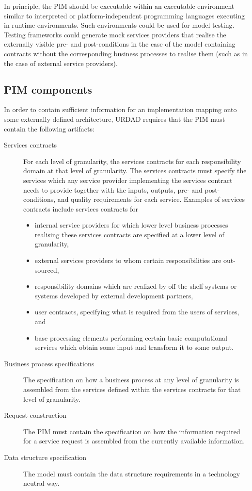 \documentclass{IOS-Book-Article}
\begin{document}
In principle, the PIM should be executable within an executable environment
similar to interpreted or platform-independent programming languages executing
in runtime environments. Such environments could be used for model testing. 
Testing frameworks could generate mock services providers that realise the externally
visible pre- and post-conditions in the case of the model containing contracts without
the corresponding business processes to realise them (such as in the case of external
service providers).


\subsection{PIM components}

In order to contain sufficient information for an implementation mapping onto
some externally defined architecture, 
URDAD requires that the PIM must contain the following artifacts:
\begin{description}
  \item[Services contracts] For each level of granularity, the services
 	contracts for each responsibility domain at that level of
	granularity. The services contracts must specify the services which
	any service provider implementing the services contract needs to
	provide together with the inputs, outputs, pre- and post-conditions, and
	quality requirements for each service.
	Examples of services contracts include services contracts for 
	\begin{itemize}
	  \item internal service providers for which lower level
		business processes
		realising these services contracts are specified at a lower
		level of granularity,
	  \item external services providers to whom
		certain responsibilities are out-sourced,
	  \item responsibility domains which are
		realized by off-the-shelf systems or systems developed by
		external development partners,
	  \item user contracts, specifying what is required from the users of
		services, and
	  \item base processing elements performing certain basic computational
		services which obtain some input and transform it to some
		output.
	\end{itemize}

  \item[Business process specifications] The specification on how a business
	process at any level of granularity is assembled from the services
	defined within the services contracts for that level of granularity.	

  \item[Request construction] The PIM must contain the specification on
	how the information required for a service request is assembled
	from the currently available information.

  \item[Data structure specification] The model must contain the data structure
	requirements in a technology neutral way.
\end{description}
\end{document}
